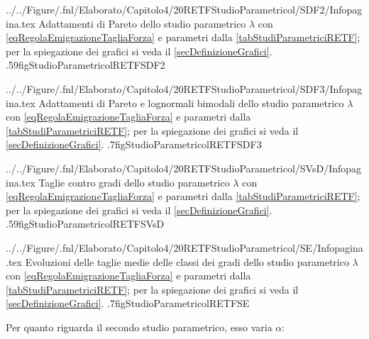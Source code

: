             {../../Figure/.fnl/Elaborato/Capitolo4/20RETFStudioParametricol/SDF2/Infopagina.tex}
            {Adattamenti di Pareto dello studio parametrico \(\lambda\) con \ref{eqRegolaEmigrazioneTagliaForza} e parametri dalla \cref{tabStudiParametriciRETF}; per la spiegazione dei grafici si veda il \cref{secDefinizioneGrafici}.}
            {.59\linewidth}{figStudioParametricolRETFSDF2}

            {../../Figure/.fnl/Elaborato/Capitolo4/20RETFStudioParametricol/SDF3/Infopagina.tex}
            {Adattamenti di Pareto e lognormali bimodali dello studio parametrico \(\lambda\) con \ref{eqRegolaEmigrazioneTagliaForza} e parametri dalla \cref{tabStudiParametriciRETF}; per la spiegazione dei grafici si veda il \cref{secDefinizioneGrafici}.}
            {.7\linewidth}{figStudioParametricolRETFSDF3}

            {../../Figure/.fnl/Elaborato/Capitolo4/20RETFStudioParametricol/SVsD/Infopagina.tex}
            {Taglie contro gradi dello studio parametrico \(\lambda\) con \ref{eqRegolaEmigrazioneTagliaForza} e parametri dalla \cref{tabStudiParametriciRETF}; per la spiegazione dei grafici si veda il \cref{secDefinizioneGrafici}.}
            {.59\linewidth}{figStudioParametricolRETFSVsD}

            {../../Figure/.fnl/Elaborato/Capitolo4/20RETFStudioParametricol/SE/Infopagina.tex}
            {Evoluzioni delle taglie medie delle classi dei gradi dello studio parametrico \(\lambda\) con \ref{eqRegolaEmigrazioneTagliaForza} e parametri dalla \cref{tabStudiParametriciRETF}; per la spiegazione dei grafici si veda il \cref{secDefinizioneGrafici}.}
            {.7\linewidth}{figStudioParametricolRETFSE}

        Per quanto riguarda il secondo studio parametrico, esso varia \(\alpha\):

